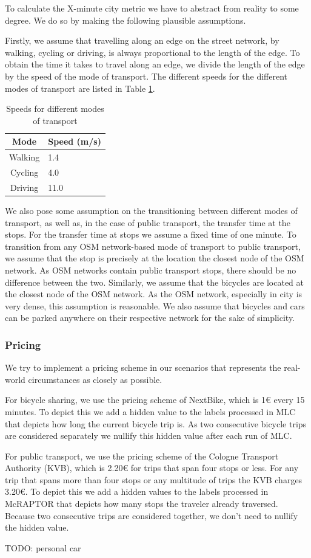 To calculate the X-minute city metric we have to abstract from reality to some degree.
We do so by making the following plausible assumptions.

Firstly, we assume that travelling along an edge on the street network, by walking, cycling or driving, is always proportional to the length of the edge.
To obtain the time it takes to travel along an edge, we divide the length of the edge by the speed of the mode of transport.
The different speeds for the different modes of transport are listed in Table \ref{table:speeds}.

\begin{table}[h]
\centering
\begin{tabular}{|c|l|}
\hline
\textbf{Mode} & \textbf{Speed (m/s)} \\
\hline
Walking & 1.4 \\
\hline
Cycling & 4.0 \\
\hline
Driving & 11.0 \\
\hline
\end{tabular}
\caption{Speeds for different modes of transport}
\label{table:speeds}
\end{table}

We also pose some assumption on the transitioning between different modes of transport, as well as, in the case of public transport, the transfer time at the stops.
For the transfer time at stops we assume a fixed time of one minute.
To transition from any OSM network-based mode of transport to public transport, we assume that the stop is precisely at the location the closest node of the OSM network.
As OSM networks contain public transport stops, there should be no difference between the two.
Similarly, we assume that the bicycles are located at the closest node of the OSM network.
As the OSM network, especially in city is very dense, this assumption is reasonable.
We also assume that bicycles and cars can be parked anywhere on their respective network for the sake of simplicity.


\subsubsection{Pricing}
\label{subs:pricing}

We try to implement a pricing scheme in our scenarios that represents the real-world circumstances as closely as possible.

For bicycle sharing, we use the pricing scheme of NextBike, which is 1€ every 15 minutes.
To depict this we add a hidden value to the labels processed in MLC that depicts how long the current bicycle trip is.
As two consecutive bicycle trips are considered separately we nullify this hidden value after each run of MLC.

For public transport, we use the pricing scheme of the Cologne Transport Authority (KVB), which is 2.20€ for trips that span four stops or less.
For any trip that spans more than four stops or any multitude of trips the KVB charges 3.20€.
To depict this we add a hidden values to the labels processed in McRAPTOR that depicts how many stops the traveler already traversed.
Because two consecutive trips are considered together, we don't need to nullify the hidden value.

TODO: personal car
